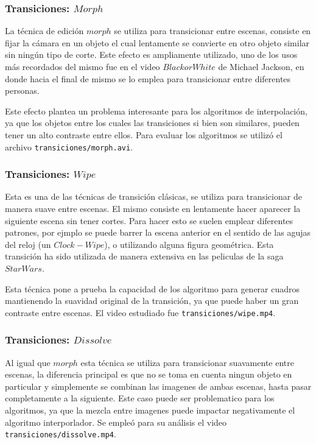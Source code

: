 \subsubsection{Transiciones: $Morph$}

La técnica de edición $morph$ se utiliza para transicionar entre escenas, consiste en fijar la cámara en un objeto el cual lentamente se convierte en otro objeto similar sin ningún tipo de corte. Este efecto es ampliamente utilizado, uno de los usos más recordados del mismo fue en el video $Black or White$ de Michael Jackson, en donde hacia el final de mismo se lo emplea para transicionar entre diferentes personas.

Este efecto plantea un problema interesante para los algoritmos de interpolación, ya que los objetos entre los cuales las transiciones si bien son similares, pueden tener un alto contraste entre ellos. Para evaluar los algoritmos se utilizó el archivo \texttt{transiciones/morph.avi}.

\subsubsection{Transiciones: $Wipe$}

Esta es una de las técnicas de transición clásicas, se utiliza para transicionar de manera suave entre escenas. El mismo consiste en lentamente hacer aparecer la siguiente escena sin tener cortes. Para hacer esto se suelen emplear diferentes patrones, por ejmplo se puede barrer la escena anterior en el sentido de las agujas del reloj (un $Clock-Wipe$), o utilizando alguna figura geométrica. Esta transición ha sido utilizada de manera extensiva en las peliculas de la saga $Star Wars$.

Esta técnica pone a prueba la capacidad de los algoritmo para generar cuadros mantienendo la suavidad original de la transición, ya que puede haber un gran contraste entre escenas. El video estudiado fue \texttt{transiciones/wipe.mp4}.

\subsubsection{Transiciones: $Dissolve$}

Al igual que $morph$ esta técnica se utiliza para transicionar suavamente entre escenas, la diferencia principal es que no se toma en cuenta ningun objeto en particular y simplemente se combinan las imagenes de ambas escenas, hasta pasar completamente a la siguiente. Este caso puede ser problematico para los algoritmos, ya que la mezcla entre imagenes puede impactar negativamente el algoritmo interporlador. Se empleó para su análisis el video \texttt{transiciones/dissolve.mp4}.

